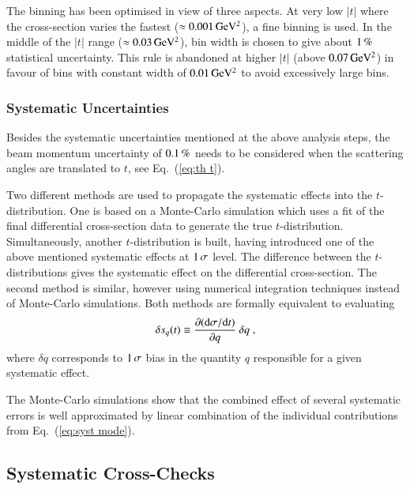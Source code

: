 The binning has been optimised in view of three aspects. At very low $|t|$ where the cross-section varies the fastest ($\approx 0.001\,{\rm GeV^2}$), a fine binning is used. In the middle of the $|t|$ range ($\approx 0.03\,{\rm GeV^2}$), bin width is chosen to give about $1\,{\rm \%}$ statistical uncertainty. This rule is abandoned at higher $|t|$ (above $0.07\,{\rm GeV^2}$) in favour of bins with constant width of $0.01\,{\rm GeV^2}$ to avoid excessively large bins.



\subsubsection{Systematic Uncertainties}
\label{sec:systematics}

Besides the systematic uncertainties mentioned at the above analysis steps, the beam momentum uncertainty of $0.1\,{\rm \%}$ needs to be considered when the scattering angles are translated to $t$, see Eq.~(\ref{eq:th t}).

Two different methods are used to propagate the systematic effects into the $t$-distribution. One is based on a Monte-Carlo simulation which uses a fit of the final differential cross-section data to generate the true $t$-distribution. Simultaneously, another $t$-distribution is built, having introduced one of the above mentioned systematic effects at $1\,{\rm \sigma}$ level. The difference between the $t$-distributions gives the systematic effect on the differential cross-section. The second method is similar, however using numerical integration techniques instead of Monte-Carlo simulations. Both methods are formally equivalent to evaluating
\begin{equation}
\label{eq:syst mode}
\delta s_{q}(t) \equiv \frac{\partial({\rm d}\sigma/{\rm d} t)}{\partial q}\ \delta q\ ,
\end{equation}
where $\delta q$ corresponds to $1\,{\rm \sigma}$ bias in the quantity $q$ responsible for a given systematic effect.

The Monte-Carlo simulations show that the combined effect of several systematic errors is well approximated by linear combination of the individual contributions from Eq.~(\ref{eq:syst mode}).



\subsection{Systematic Cross-Checks}
\label{sec:cross checks}

